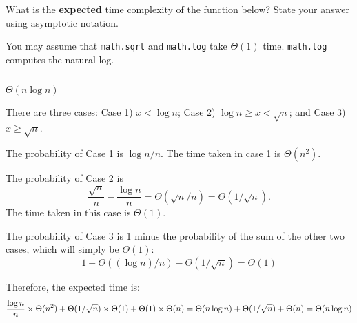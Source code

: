 
\begin{prob}
    What is the \textbf{expected} time complexity of the function below?
    State your answer using asymptotic notation.

    You may assume that \texttt{math.sqrt} and \texttt{math.log} take $\Theta(1)$
    time. \texttt{math.log} computes the natural log.

    \inputminted{python}{./code.py}

    \begin{soln}
        $\Theta(n \log n)$

        There are three cases: Case 1) $x < \log n$; Case 2) $\log n \geq x <
        \sqrt n$; and Case 3) $x \geq \sqrt{n}$.

        The probability of Case 1 is $\log n / n$. The time taken in case 1 is
        $\Theta(n^2)$.

        The probability of Case 2 is \[
            \frac{\sqrt n}{n} - \frac{\log n}{n} = \Theta(\sqrt n / n) = \Theta(1/\sqrt n).
        \] The time taken in this case is $\Theta(1)$.

        The probability of Case 3 is 1 minus the probability of the sum of the
        other two cases, which will simply be $\Theta(1)$: \[
            1 - \Theta((\log n) / n) - \Theta(1 / \sqrt{n}) = \Theta(1)
        \]

        Therefore, the expected time is:
        \[
            \frac{\log n}{n} \times \Theta(n^2)
            + \Theta(1/\sqrt n) \times \Theta(1)
            + \Theta(1) \times \Theta(n)
            =
            \Theta(n \log n) + \Theta(1 / \sqrt n) + \Theta(n)
            \\
            =
            \Theta(n \log n)
        \]
    \end{soln}

\end{prob}
